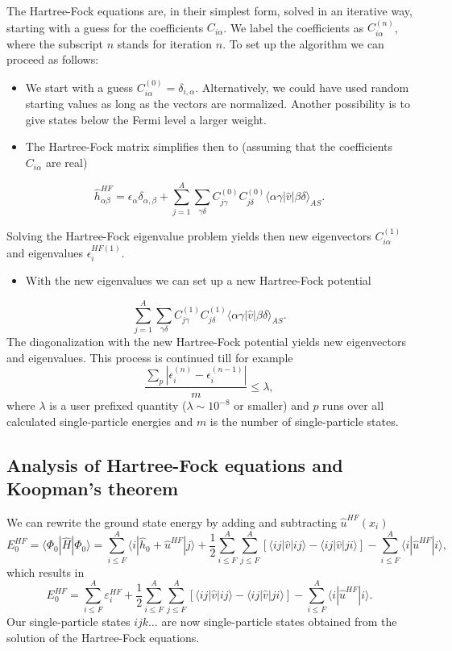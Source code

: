 \documentclass[%
oneside,                 %
final,                   %
10pt]{article}
\begin{document}
The Hartree-Fock equations are, in their simplest form, solved in an iterative way, starting with a guess for the
coefficients $C_{i\alpha}$. We label the coefficients as $C_{i\alpha}^{(n)}$, where the subscript $n$ stands for iteration $n$.
To set up the algorithm we can proceed as follows:

\begin{itemize}
 \item We start with a guess $C_{i\alpha}^{(0)}=\delta_{i,\alpha}$. Alternatively, we could have used random starting values as long as the vectors are normalized. Another possibility is to give states below the Fermi level a larger weight.

 \item The Hartree-Fock matrix simplifies then to (assuming that the coefficients $C_{i\alpha} $  are real)
\end{itemize}

\noindent
\[
\hat{h}_{\alpha\beta}^{HF}=\epsilon_{\alpha}\delta_{\alpha,\beta}+
\sum_{j = 1}^A\sum_{\gamma\delta} C_{j\gamma}^{(0)}C_{j\delta}^{(0)}\langle \alpha\gamma|\hat{v}|\beta\delta\rangle_{AS}.
\]

Solving the Hartree-Fock eigenvalue problem yields then new eigenvectors $C_{i\alpha}^{(1)}$ and eigenvalues
$\epsilon_i^{HF(1)}$. 
\begin{itemize}
 \item With the new eigenvalues we can set up a new Hartree-Fock potential 
\end{itemize}

\noindent
\[
\sum_{j = 1}^A\sum_{\gamma\delta} C_{j\gamma}^{(1)}C_{j\delta}^{(1)}\langle \alpha\gamma|\hat{v}|\beta\delta\rangle_{AS}.
\]
The diagonalization with the new Hartree-Fock potential yields new eigenvectors and eigenvalues.
This process is continued till for example
\[
\frac{\sum_{p} |\epsilon_i^{(n)}-\epsilon_i^{(n-1)}|}{m} \le \lambda,  
\]
where $\lambda$ is a user prefixed quantity ($\lambda \sim 10^{-8}$ or smaller) and $p$ runs over all calculated single-particle
energies and $m$ is the number of single-particle states.

\subsection*{Analysis of Hartree-Fock equations and Koopman's theorem}

We can rewrite the ground state energy by adding and subtracting $\hat{u}^{HF}(x_i)$ 
\[
  E_0^{HF} =\langle \Phi_0 | \hat{H} | \Phi_0\rangle = 
\sum_{i\le F}^A \langle i | \hat{h}_0 +\hat{u}^{HF}| j\rangle+ \frac{1}{2}\sum_{i\le F}^A\sum_{j \le F}^A\left[\langle ij |\hat{v}|ij \rangle-\langle ij|\hat{v}|ji\rangle\right]-\sum_{i\le F}^A \langle i |\hat{u}^{HF}| i\rangle,
\]
which results in
\[
  E_0^{HF}
  = \sum_{i\le F}^A \varepsilon_i^{HF} + \frac{1}{2}\sum_{i\le F}^A\sum_{j \le F}^A\left[\langle ij |\hat{v}|ij \rangle-\langle ij|\hat{v}|ji\rangle\right]-\sum_{i\le F}^A \langle i |\hat{u}^{HF}| i\rangle.
\]
Our single-particle states $ijk\dots$ are now single-particle states obtained from the solution of the Hartree-Fock equations.
\end{document}
